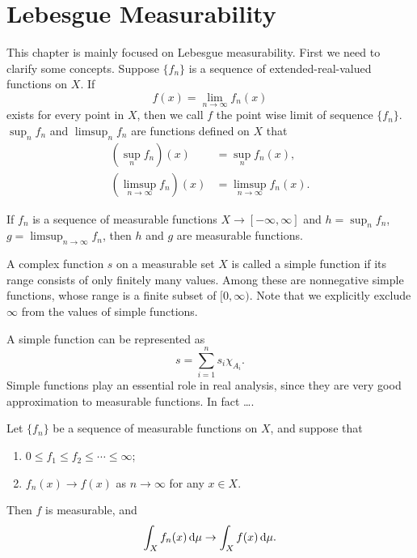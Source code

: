 \chapter{Lebesgue Measurability}
This chapter is mainly focused on Lebesgue measurability. First we need 
to clarify some concepts. 
Suppose $\{f_n\}$ is a sequence of extended-real-valued functions on 
$X$. 
If
\begin{equation}
    f(x) = \lim_{n\to\infty} f_n(x)
\end{equation}
exists for every point in $X$, then we call $f$ the point wise limit of 
sequence $\{f_n\}$. $\sup_n f_n$ and $\limsup _n f_n$ are functions defined 
on $X$ that 
\begin{align}
    \left(\sup_n f_n \right)(x) &= \sup_n f_n(x), \\
    \left(\limsup_{n\to\infty}f_n\right) (x) &= \limsup_{n\to\infty} f_n(x).
\end{align}

\begin{thm}
\label{thm: measurability_of_sup}
If ${f_n}$ is a sequence of measurable functions $X \to [-\infty, \infty]$ 
and $h = \sup_n f_n$, $g = \limsup_{n\to\infty} f_n$, then $h$ and $g$ are 
measurable functions.
\end{thm}

\begin{defn}
A complex function $s$ on a measurable set $X$ is called a simple function 
if its range consists of only finitely many values. Among these are 
nonnegative simple functions, whose range is a finite subset of $[0, 
\infty)$. Note that we explicitly exclude $\infty$ from the values of 
simple functions.
\end{defn}
A simple function can be represented as 
\begin{equation}
    s = \sum_{i = 1}^n s_i \chi_{A_i}.
\end{equation}
Simple functions play an essential role in real analysis, since they are 
very good approximation to measurable functions. In fact \dots.

\begin{thm}
Let $\{f_n\}$ be a sequence of measurable functions on $X$, and suppose 
that
\begin{enumerate}
    \item $0 \le f_1 \le f_2 \le \cdots \le \infty$;
    \item $f_n(x) \to f(x)$ as $n\to \infty$ for any $x \in X$.
\end{enumerate}
Then $f$ is measurable, and 
\begin{equation}
    \int _X f_n(x) \mathop{}\!\mathrm{d} \mu \to \int _X f(x) \mathop{}\!\mathrm{d} \mu.
\end{equation}
\end{thm}

